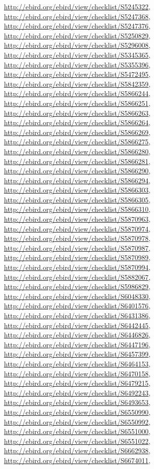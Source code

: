 \documentclass[9pt, article]{memoir}
\begin{document}
\begin{multicols}{2}
\url{http://ebird.org/ebird/view/checklist/S5245322}, 
\url{http://ebird.org/ebird/view/checklist/S5247368}, 
\url{http://ebird.org/ebird/view/checklist/S5247376}, 
\url{http://ebird.org/ebird/view/checklist/S5250829}, 
\url{http://ebird.org/ebird/view/checklist/S5296008}, 
\url{http://ebird.org/ebird/view/checklist/S5345365}, 
\url{http://ebird.org/ebird/view/checklist/S5355396}, 
\url{http://ebird.org/ebird/view/checklist/S5472495}, 
\url{http://ebird.org/ebird/view/checklist/S5842359}, 
\url{http://ebird.org/ebird/view/checklist/S5866244}, 
\url{http://ebird.org/ebird/view/checklist/S5866251}, 
\url{http://ebird.org/ebird/view/checklist/S5866263}, 
\url{http://ebird.org/ebird/view/checklist/S5866264}, 
\url{http://ebird.org/ebird/view/checklist/S5866269}, 
\url{http://ebird.org/ebird/view/checklist/S5866275}, 
\url{http://ebird.org/ebird/view/checklist/S5866280}, 
\url{http://ebird.org/ebird/view/checklist/S5866281}, 
\url{http://ebird.org/ebird/view/checklist/S5866290}, 
\url{http://ebird.org/ebird/view/checklist/S5866294}, 
\url{http://ebird.org/ebird/view/checklist/S5866303}, 
\url{http://ebird.org/ebird/view/checklist/S5866305}, 
\url{http://ebird.org/ebird/view/checklist/S5866310}, 
\url{http://ebird.org/ebird/view/checklist/S5870963}, 
\url{http://ebird.org/ebird/view/checklist/S5870974}, 
\url{http://ebird.org/ebird/view/checklist/S5870978}, 
\url{http://ebird.org/ebird/view/checklist/S5870987}, 
\url{http://ebird.org/ebird/view/checklist/S5870989}, 
\url{http://ebird.org/ebird/view/checklist/S5870994}, 
\url{http://ebird.org/ebird/view/checklist/S5882067}, 
\url{http://ebird.org/ebird/view/checklist/S5986829}, 
\url{http://ebird.org/ebird/view/checklist/S6048330}, 
\url{http://ebird.org/ebird/view/checklist/S6401576}, 
\url{http://ebird.org/ebird/view/checklist/S6431386}, 
\url{http://ebird.org/ebird/view/checklist/S6442445}, 
\url{http://ebird.org/ebird/view/checklist/S6446826}, 
\url{http://ebird.org/ebird/view/checklist/S6447196}, 
\url{http://ebird.org/ebird/view/checklist/S6457399}, 
\url{http://ebird.org/ebird/view/checklist/S6464153}, 
\url{http://ebird.org/ebird/view/checklist/S6470158}, 
\url{http://ebird.org/ebird/view/checklist/S6479215}, 
\url{http://ebird.org/ebird/view/checklist/S6492243}, 
\url{http://ebird.org/ebird/view/checklist/S6493653}, 
\url{http://ebird.org/ebird/view/checklist/S6550990}, 
\url{http://ebird.org/ebird/view/checklist/S6550992}, 
\url{http://ebird.org/ebird/view/checklist/S6551000}, 
\url{http://ebird.org/ebird/view/checklist/S6551022}, 
\url{http://ebird.org/ebird/view/checklist/S6662938}, 
\url{http://ebird.org/ebird/view/checklist/S6674011}, 

\end{multicols}
\end{document}
